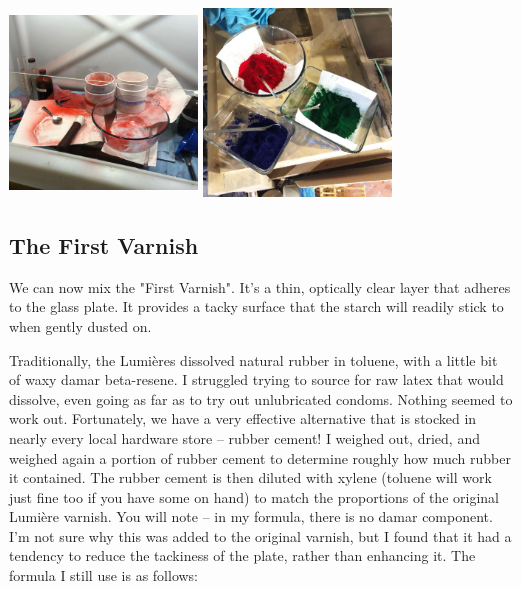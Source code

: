 \documentclass[11pt]{article}
\begin{document}
\begin{center}
\includegraphics[width=5cm, height=5cm]{img/part1_13.jpg}
\includegraphics[width=5cm, height=5cm]{img/part1_14.jpg}
\end{center}

\subsection{The First Varnish}

We can now mix the "First Varnish". It's a thin, optically clear layer that adheres to the glass plate. It provides a tacky surface that the starch will readily stick to when gently dusted on.\newline

Traditionally, the Lumières dissolved natural rubber in toluene, with a little bit of waxy damar beta-resene. I struggled trying to source for raw latex that would dissolve, even going as far as to try out unlubricated condoms. Nothing seemed to work out. Fortunately, we have a very effective alternative that is stocked in nearly every local hardware store -- rubber cement! I weighed out, dried, and weighed again a portion of rubber cement to determine roughly how much rubber it contained. The rubber cement is then diluted with xylene (toluene will work just fine too if you have some on hand) to match the proportions of the original Lumière varnish. You will note -- in my formula, there is no damar component. I'm not sure why this was added to the original varnish, but I found that it had a tendency to reduce the tackiness of the plate, rather than enhancing it. The formula I still use is as follows:\newline
 
\end{document}
